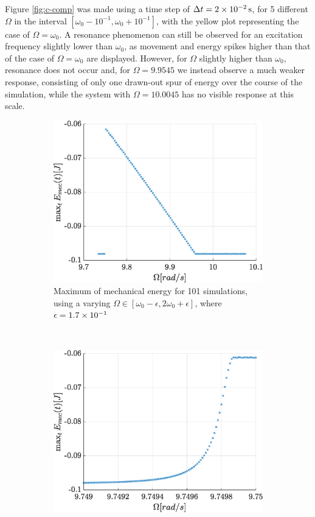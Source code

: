 \documentclass[a4paper,12pt,twoside]{article}
\begin{document}
Figure \ref{fig:c-comp} was made using a time step of $\Delta t = \SI{2d-2}{\s}$, for 5 different $\Omega$ in the interval $[\omega_0-10^{-1}, \omega_0+10^{-1}]$, with the yellow plot representing the case of $\Omega = \omega_0$. A resonance phenomenon can still be observed for an excitation frequency slightly lower than $\omega_0$, as movement and energy spikes higher than that of the case of $\Omega=\omega_0$ are displayed. However, for $\Omega$ slightly higher than $\omega_0$, resonance does not occur and, for $\Omega=9.9545$ we instead observe a much weaker response, consisting of only one drawn-out spur of energy over the course of the simulation, while the system with $\Omega=10.0045$ has no visible response at this scale.

\begin{figure}[h]
	\begin{subfigure}[t]{0.49\textwidth}
		\includegraphics[width=\textwidth]{graphs/c_emax.eps}
		\caption{Maximum of mechanical energy for \num{101} simulations, using a varying $\Omega\in\left[\omega_0 - \epsilon, 2\omega_0 + \epsilon\right]$, where $\epsilon = \num{1.7d-1}$}
		\label{fig:c-emax-full}
	\end{subfigure}
	~
	\begin{subfigure}[t]{0.49\textwidth}
		\includegraphics[width=\textwidth]{graphs/c_emaxzoom.eps}

\end{subfigure}
\end{figure}
\end{document}
